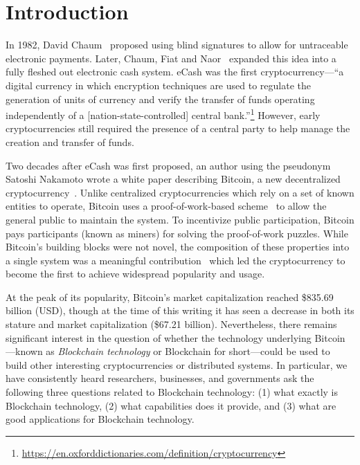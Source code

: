 
\section{Introduction}

In 1982, David Chaum~\cite{Cha82} proposed using blind signatures to allow for untraceable electronic payments.
Later, Chaum, Fiat and Naor~\cite{chaum1988untraceable} expanded this idea into a fully fleshed out electronic cash system.
eCash was the first cryptocurrency---\ie ``a digital currency in which encryption techniques are used to regulate the generation of units of currency and verify the transfer of funds operating independently of a [nation-state-controlled] central bank.''\footnote{\url{https://en.oxforddictionaries.com/definition/cryptocurrency}}
However, early cryptocurrencies still required the presence of a central party to help manage the creation and transfer of funds.

Two decades after eCash was first proposed, an author using the pseudonym Satoshi Nakamoto wrote a white paper describing Bitcoin, a new decentralized cryptocurrency~\cite{Nak08}.
Unlike centralized cryptocurrencies which rely on a set of known entities to operate, Bitcoin uses a proof-of-work-based scheme~\cite{DN93,back1997partial} to allow the general public to maintain the system.
To incentivize public participation, Bitcoin pays participants (known as miners) for solving the proof-of-work puzzles.
While Bitcoin's building blocks were not novel, the composition of these properties into a single system was a meaningful contribution~\cite{Narayanan17} which led the cryptocurrency to become the first to achieve widespread popularity and usage.

At the peak of its popularity, Bitcoin's market capitalization reached \$835.69 billion (USD), though at the time of this writing it has seen a decrease in both its stature and market capitalization (\$67.21 billion).
Nevertheless, there remains significant interest in the question of whether the technology underlying Bitcoin---known as \emph{Blockchain technology} or {Blockchain} for short---could be used to build other interesting cryptocurrencies or distributed systems.
In particular, we have consistently heard researchers, businesses, and governments ask the following three questions related to Blockchain technology: (1) what exactly is Blockchain technology, (2) what capabilities does it provide, and (3) what are good applications for Blockchain technology.%

